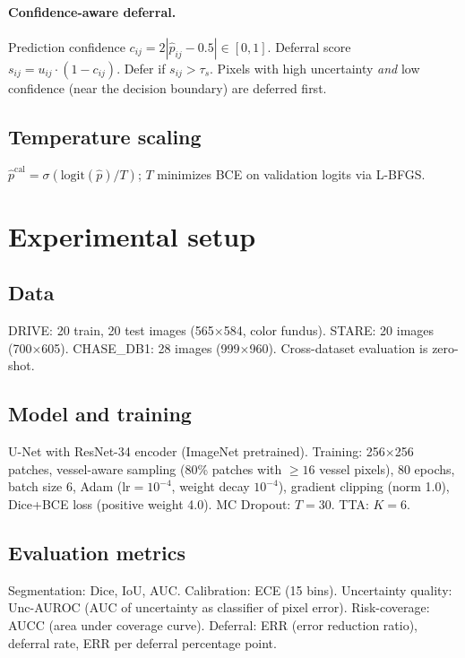 \documentclass[review,3p]{elsarticle}
\begin{document}
\paragraph{Confidence-aware deferral.}
Prediction confidence $c_{ij} = 2|\hat{p}_{ij} - 0.5| \in [0,1]$. Deferral
score $s_{ij} = u_{ij} \cdot (1 - c_{ij})$. Defer if $s_{ij} > \tau_s$.
Pixels with high uncertainty \emph{and} low confidence (near the decision
boundary) are deferred first.

\subsection{Temperature scaling}

$\hat{p}^{\text{cal}} = \sigma(\text{logit}(\hat{p})/T)$; $T$ minimizes
BCE on validation logits via L-BFGS.

\section{Experimental setup}

\subsection{Data}

DRIVE: 20 train, 20 test images (565$\times$584, color fundus). STARE: 20
images (700$\times$605). CHASE\_DB1: 28 images (999$\times$960). Cross-dataset
evaluation is zero-shot.

\subsection{Model and training}

U-Net with ResNet-34 encoder (ImageNet pretrained). Training: 256$\times$256
patches, vessel-aware sampling (80\% patches with $\geq 16$ vessel pixels),
80 epochs, batch size 6, Adam ($\text{lr} = 10^{-4}$, weight decay $10^{-4}$),
gradient clipping (norm 1.0), Dice+BCE loss (positive weight 4.0). MC Dropout:
$T = 30$. TTA: $K = 6$.

\subsection{Evaluation metrics}

Segmentation: Dice, IoU, AUC. Calibration: ECE (15 bins). Uncertainty
quality: Unc-AUROC (AUC of uncertainty as classifier of pixel error).
Risk-coverage: AUCC (area under coverage curve). Deferral: ERR (error
reduction ratio), deferral rate, ERR per deferral percentage point.
\end{document}
